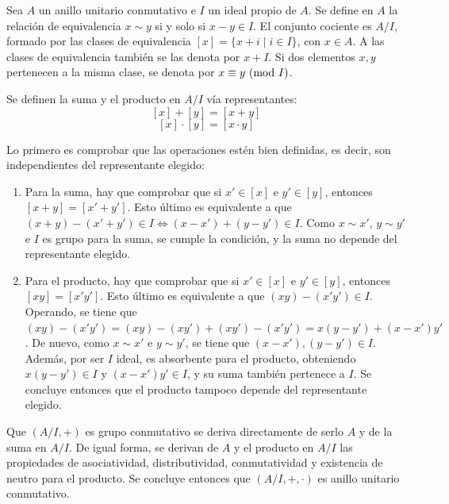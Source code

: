 \begin{deff}{\cite[pp.~25-26]{GamboaAnillos}}
    Sea $A$ un anillo unitario conmutativo e $I$ un ideal propio de $A$. Se define en $A$ la relación de equivalencia $x \sim y$ si y solo si $x - y \in I$. El conjunto cociente es $A/I$, formado por las clases de equivalencia $[x] = \{x + i\mid i\in I\}$, con $x\in A$. A las clases de equivalencia también se las denota por $x + I$. Si dos elementos $x,y$ pertenecen a la misma clase, se denota por $x \equiv y \text{ (mod }I)$.
    \item Se definen la suma y el producto en $A/I$ vía representantes:
    \[[x] + [y] = [x + y]\]
    \[[x] \cdot [y] = [x \cdot y]\]
\end{deff}

\begin{prop}
\end{prop}
\begin{dem}{\cite[pp.~25-26]{GamboaAnillos}}
    Lo primero es comprobar que las operaciones estén bien definidas, es decir, son independientes del representante elegido: \vspace{-0.5em}
    \begin{enumerate}[label={--}, leftmargin=12pt]
        \item Para la suma, hay que comprobar que si $x'\in [x]$ e $y'\in [y]$, entonces $[x + y] = [x' + y']$. Esto último es equivalente a que $(x + y) - (x' + y') \in I \iff (x-x') + (y-y') \in I$. Como $x \sim x'$, $y \sim y'$ e $I$ es grupo para la suma, se cumple la condición, y la suma no depende del representante elegido.
        \item Para el producto, hay que comprobar que si $x'\in [x]$ e $y'\in [y]$, entonces $[xy] = [x'y']$. Esto último es equivalente a que $(xy) - (x'y') \in I$. Operando, se tiene que $(xy) - (x'y') = (xy) - (xy') + (xy') - (x'y') = x(y-y') + (x-x')y'$. De nuevo, como $x \sim x'$ e $y \sim y'$, se tiene que $(x-x'),(y-y') \in I$. Además, por ser $I$ ideal, es absorbente para el producto, obteniendo $x(y-y')\in I$ y $(x-x')y'\in I$, y su suma también pertenece a $I$. Se concluye entonces que el producto tampoco depende del representante elegido.
    \end{enumerate}
    Que $(A/I, +)$ es grupo conmutativo se deriva directamente de serlo $A$ y de la suma en $A/I$. De igual forma, se derivan de $A$ y el producto en $A/I$ las propiedades de asociatividad, distributividad, conmutatividad y existencia de neutro para el producto. Se concluye entonces que $(A/I, + , \cdot )$ es anillo unitario conmutativo.
\end{dem}

